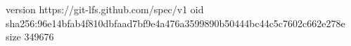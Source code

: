 version https://git-lfs.github.com/spec/v1
oid sha256:96e14bfab4f810dbfaad7bf9e4a476a3599890b50444bc44c5c7602c662e278e
size 349676
